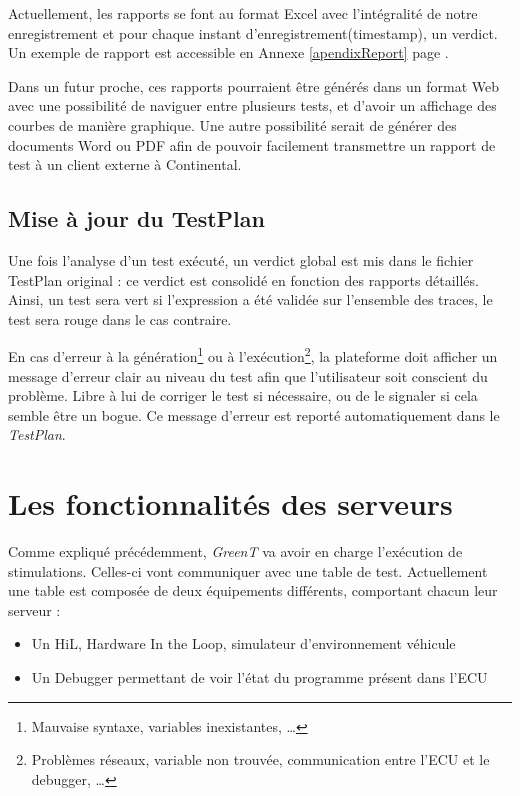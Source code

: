 Actuellement, les rapports se font au format Excel avec l'intégralité de notre enregistrement et pour chaque instant d'enregistrement(timestamp), un verdict. Un
exemple de rapport est accessible en Annexe \ref{apendixReport} page \pageref{apendixReport}. 

Dans un futur proche, ces rapports pourraient être générés dans un format Web avec une possibilité de naviguer entre plusieurs tests, et
d'avoir un affichage des courbes de manière graphique. Une autre possibilité serait de générer des documents Word ou PDF afin de pouvoir facilement transmettre un rapport de test à un client externe à Continental.

\subsection{Mise à jour du TestPlan}
Une fois l'analyse d'un test exécuté, un verdict global est mis dans le fichier TestPlan original : ce verdict est consolidé en fonction des rapports détaillés. Ainsi, un test sera vert si l'expression a été validée sur l'ensemble des traces, le test sera rouge dans le cas contraire.

\begin{remarque}
	En cas d'erreur à la génération\footnote{Mauvaise syntaxe, variables inexistantes, \ldots} ou à l'exécution\footnote{Problèmes réseaux, variable non trouvée, communication entre l'ECU et le debugger, \ldots}, la plateforme doit afficher un message d'erreur clair au niveau du test afin que l'utilisateur soit conscient du problème. Libre à lui de corriger le test si nécessaire, ou de le signaler si cela semble être un bogue. Ce message d'erreur est reporté automatiquement dans le \textit{TestPlan}.
\end{remarque}

\section{Les fonctionnalités des serveurs}\label{wbgt}
Comme expliqué précédemment, \textit{GreenT} va avoir en charge l'exécution de stimulations. Celles-ci vont communiquer avec une table de
test. Actuellement une table est composée de deux équipements différents, comportant chacun leur serveur : 
\begin{itemize}
	\item Un HiL, Hardware In the Loop, simulateur d'environnement véhicule
	\item Un Debugger permettant de voir l'état du programme présent dans l'ECU	
\end{itemize}

